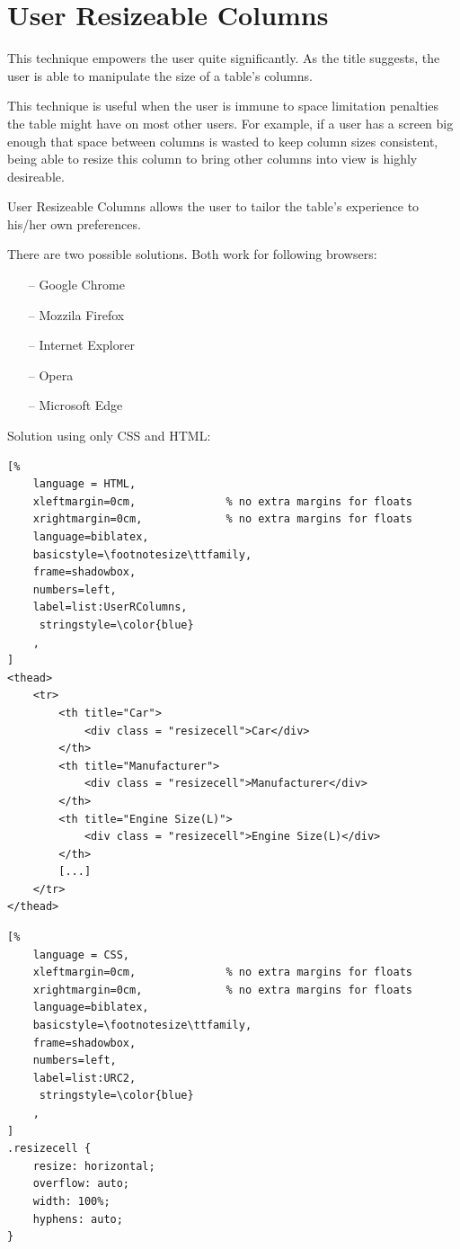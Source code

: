 \section{User Resizeable Columns}
This technique empowers the user quite significantly. As the title
suggests, the user is able to manipulate the size of a table's
columns. 

This technique is useful when the user is immune to space limitation
penalties the table might have on most other users. For example, if a
user has a screen big enough that space between columns is wasted to
keep column sizes consistent, being able to resize this column to
bring other columns into view is highly desireable.

User Resizeable Columns allows the user to tailor the table's
experience to his/her own preferences. 

There are two possible solutions. Both work for following browsers:
\begin{itemize}
    \item[--] Google Chrome
    \item[--] Mozzila Firefox
    \item[--] Internet Explorer
    \item[--] Opera
    \item[--] Microsoft Edge
\end{itemize}

Solution using only CSS and HTML:
\begin{lstlisting}[%
    language = HTML,
    xleftmargin=0cm,              % no extra margins for floats
    xrightmargin=0cm,             % no extra margins for floats
    language=biblatex,
    basicstyle=\footnotesize\ttfamily,
    frame=shadowbox,
    numbers=left,
    label=list:UserRColumns,
     stringstyle=\color{blue}
    ,
]
<thead>
    <tr>
        <th title="Car">
            <div class = "resizecell">Car</div>
        </th>
        <th title="Manufacturer">
            <div class = "resizecell">Manufacturer</div>
        </th>
        <th title="Engine Size(L)">
            <div class = "resizecell">Engine Size(L)</div>
        </th>
        [...]
    </tr>
</thead>
\end{lstlisting}

\begin{lstlisting}[%
    language = CSS,
    xleftmargin=0cm,              % no extra margins for floats
    xrightmargin=0cm,             % no extra margins for floats
    language=biblatex,
    basicstyle=\footnotesize\ttfamily,
    frame=shadowbox,
    numbers=left,
    label=list:URC2,
     stringstyle=\color{blue}
    ,
]
.resizecell {
    resize: horizontal;
    overflow: auto;
    width: 100%;
    hyphens: auto;
}
\end{lstlisting}

